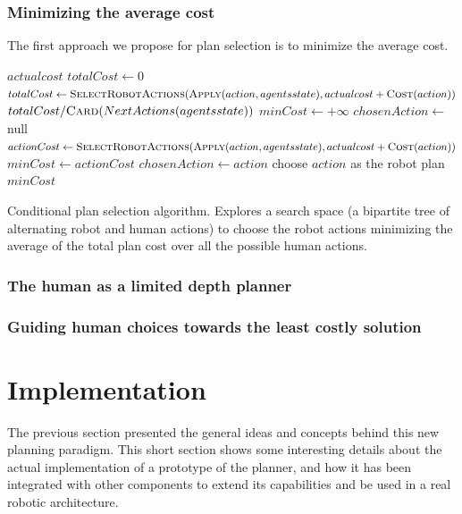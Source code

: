 \documentclass[a4paper,11pt,twoside]{StyleThese}
\begin{document}
\subsubsection{Minimizing the average cost}
The first approach we propose for plan selection is to minimize the average cost.

\begin{algorithm}[H]
\begin{algorithmic}[1]
	\State \Return $actualcost$
\EndIf
{}
	\State $totalCost \leftarrow 0$
		\State $totalCost \leftarrow \textsc{SelectRobotActions}(\textsc{Apply}(action, agentsstate), actualcost + \textsc{Cost}(action))$
	\EndFor
	\Return $totalCost / \textsc{Card}(NextActions(agentsstate))$
\Else
	\State $minCost \leftarrow +\infty$
	\State $chosenAction \leftarrow$ null
		\State $actionCost \leftarrow \textsc{SelectRobotActions}(\textsc{Apply}(action, agentsstate), actualcost + \textsc{Cost}(action))$
			\State $minCost \leftarrow actionCost$
			\State $chosenAction \leftarrow action$
		\EndIf
	\EndFor
	\State choose $action$ as the robot plan
	\Return $minCost$	
\EndIf
\EndFunction
	
\end{algorithmic}
 \caption{Conditional plan selection algorithm. Explores a search space (a bipartite tree of alternating robot and human actions) to choose the robot actions minimizing the average of the total plan cost over all the possible human actions.}
 \label{alg:minaverage}
\end{algorithm}


\subsubsection{The human as a limited depth planner}

\subsubsection{Guiding human choices towards the least costly solution}

\section{Implementation}
The previous section presented the general ideas and concepts behind this new planning paradigm. This short section shows some interesting details about the actual implementation of a prototype of the planner, and how it has been integrated with other components to extend its capabilities and be used in a real robotic architecture.
\end{document}
